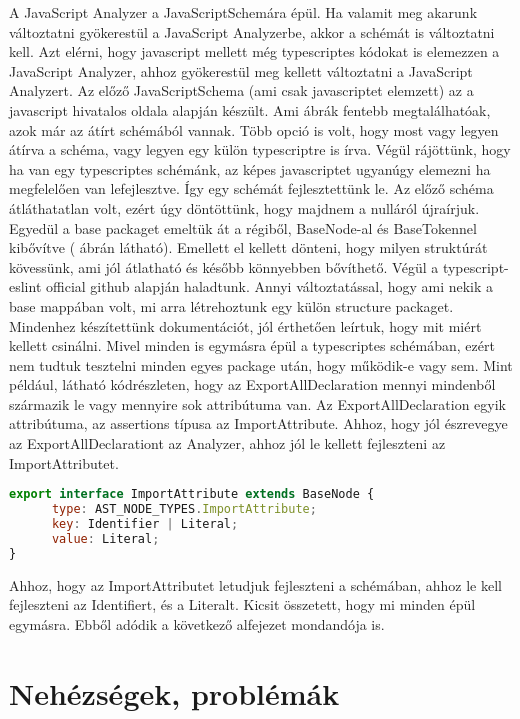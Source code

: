 A JavaScript Analyzer a JavaScriptSchemára épül. Ha valamit meg akarunk változtatni gyökerestül a JavaScript Analyzerbe, akkor a schémát is változtatni kell.
Azt elérni, hogy javascript mellett még typescriptes kódokat is elemezzen a JavaScript Analyzer, ahhoz gyökerestül meg kellett változtatni a JavaScript Analyzert.
Az előző JavaScriptSchema (ami csak javascriptet elemzett) az a javascript hivatalos oldala alapján készült. Ami ábrák fentebb megtalálhatóak, azok már az átírt schémából vannak.
Több opció is volt, hogy most vagy legyen átírva a schéma, vagy legyen egy külön typescriptre is írva.
Végül rájöttünk, hogy ha van egy typescriptes schémánk, az képes javascriptet ugyanúgy elemezni ha megfelelően van lefejlesztve.
Így egy schémát fejlesztettünk le. Az előző schéma átláthatatlan volt, ezért úgy döntöttünk, hogy majdnem a nulláról újraírjuk.
Egyedül a base packaget emeltük át a régiből, BaseNode-al és BaseTokennel kibővítve ( ábrán látható).
Emellett el kellett dönteni, hogy milyen struktúrát kövessünk, ami jól átlatható és később könnyebben bővíthető.
Végül a typescript-eslint official github alapján haladtunk. Annyi változtatással, hogy ami nekik a base mappában volt, mi arra létrehoztunk egy külön structure packaget.
Mindenhez készítettünk dokumentációt, jól érthetően leírtuk, hogy mit miért kellett csinálni.
Mivel minden is egymásra épül a typescriptes schémában, ezért nem tudtuk tesztelni minden egyes package után, hogy működik-e vagy sem.
Mint például, látható  kódrészleten, hogy az ExportAllDeclaration mennyi mindenből származik le vagy mennyire sok attribútuma van.
Az ExportAllDeclaration egyik attribútuma, az assertions típusa az ImportAttribute. Ahhoz, hogy jól észrevegye az ExportAllDeclarationt az Analyzer, ahhoz jól le kellett fejleszteni az ImportAttributet.

\begin{lstlisting}[caption={ImportAttribute},label={lst:asg_file_import_attribute}, language={JavaScript}]
export interface ImportAttribute extends BaseNode {
      type: AST_NODE_TYPES.ImportAttribute;
      key: Identifier | Literal;
      value: Literal;
}
\end{lstlisting}
Ahhoz, hogy az ImportAttributet letudjuk fejleszteni a schémában, ahhoz le kell fejleszteni az Identifiert, és a Literalt.
Kicsit összetett, hogy mi minden épül egymásra. Ebből adódik a következő alfejezet mondandója is.

\section{Nehézségek, problémák}

